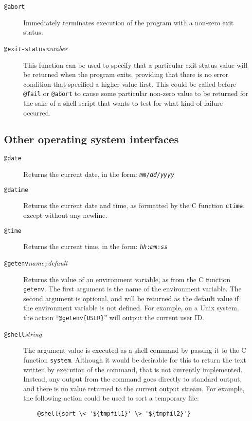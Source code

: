 \begin{description}
\item[{\tt @abort\ttlb\ttrb}]
Immediately terminates execution of the program with a non-zero exit status.

\item[{\tt @exit-status\ttlb}{\it number}{\tt \ttrb}]
This function can be used to specify that a particular exit status value
will be returned when the program exits, providing that there is no
error condition that specified a higher value first.
This could be called before \verb/@fail/ or \verb/@abort/ to cause some
particular non-zero value to be returned for the sake of a shell script
that wants to test for what kind of failure occurred.
\end{description}

\subsection{Other operating system interfaces}

\begin{description}
\item[{\tt @date\ttlb\ttrb}]
Returns the current date, in the form:
{\tt {\it mm}/{\it dd}/{\it yyyy}}
\item[{\tt @datime\ttlb\ttrb}]
Returns the current date and time, as formatted by the C function
{\tt ctime}, except without any newline.
\item[{\tt @time\ttlb\ttrb}]
Returns the current time, in the form:
{\tt {\it hh}:{\it mm}:{\it ss}}

\item[{\tt @getenv\ttlb}{\it name}{\tt ;}{\it default}{\tt \ttrb}]
Returns the value of an environment variable, as from the C function
{\tt getenv}.  The first argument is the name of the environment
variable.  The second argument is optional, and will be returned as the
default value if the environment variable is not defined.
For example, on a Unix system, the action
``\verb/@getenv{USER}/'' will output the current user ID.

\item[{\tt @shell\ttlb}{\it string}{\tt \ttrb}]
The argument value is executed as a shell command by passing it to the C
function {\tt system}.
Although it would be desirable for this to return the text written by
execution of the command, that is not currently implemented.  Instead,
any output from the command goes directly to standard output, and there
is no value returned to the current output stream.
For example, the following action could be used to sort a temporary file:
\begin{verbatim}
    @shell{sort \< '${tmpfil1}' \> '${tmpfil2}'}
\end{verbatim}
\end{description}

